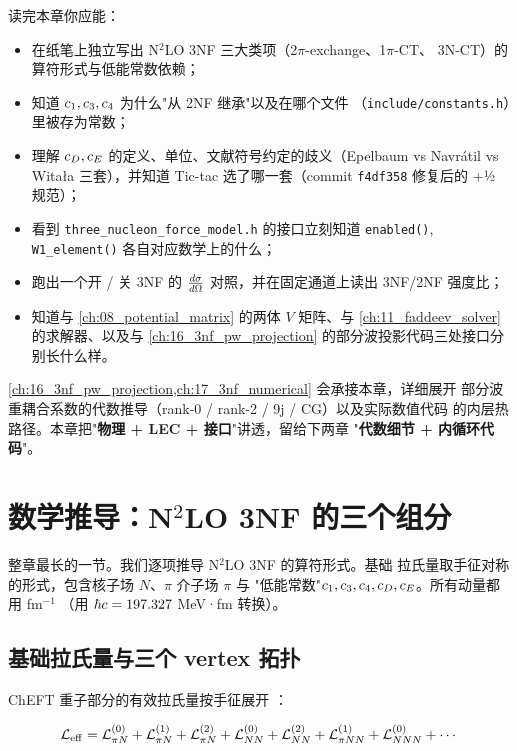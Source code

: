 读完本章你应能：
\begin{itemize}
\item 在纸笔上独立写出 N\(^2\)LO 3NF 三大类项（2\(\pi\)-exchange、1\(\pi\)-CT、
      3N-CT）的算符形式与低能常数依赖；
\item 知道 \(c_1, c_3, c_4\) 为什么"从 2NF 继承"以及在哪个文件
      （\texttt{include/constants.h}）里被存为常数；
\item 理解 \(c_D, c_E\) 的定义、单位、文献符号约定的歧义（Epelbaum vs
      Navrátil vs Witała 三套），并知道 Tic-tac 选了哪一套（commit
      \texttt{f4df358} 修复后的 +½ 规范）；
\item 看到 \texttt{three\_nucleon\_force\_model.h} 的接口立刻知道
      \texttt{enabled()}, \texttt{W1\_element()} 各自对应数学上的什么；
\item 跑出一个开 / 关 3NF 的 \(\frac{d\sigma}{d\Omega}\) 对照，并在固定通道上读出 3NF/2NF 强度比；
\item 知道与 \cref{ch:08_potential_matrix} 的两体 \(V\) 矩阵、与
      \cref{ch:11_faddeev_solver} 的求解器、以及与 \cref{ch:16_3nf_pw_projection}
      的部分波投影代码三处接口分别长什么样。
\end{itemize}

\cref{ch:16_3nf_pw_projection,ch:17_3nf_numerical} 会承接本章，详细展开
部分波重耦合系数的代数推导（rank-0 / rank-2 / 9j / CG）以及实际数值代码
的内层热路径。本章把"\textbf{物理 + LEC + 接口}"讲透，留给下两章
"\textbf{代数细节 + 内循环代码}"。

\section{数学推导：N\({}^2\)LO 3NF 的三个组分}
\label{sec:ch15-math}

整章最长的一节。我们逐项推导 N\(^2\)LO 3NF 的算符形式。基础
拉氏量取手征对称的形式，包含核子场 \(N\)、\(\pi\) 介子场 \(\pi\) 与
"低能常数"\(c_1, c_3, c_4, c_D, c_E\)。所有动量都用 fm\(^{-1}\)
（用 \(\hbar c = 197.327\) MeV·fm 转换）。

\subsection{基础拉氏量与三个 vertex 拓扑}
\label{subsec:ch15-lagrangian}

ChEFT 重子部分的有效拉氏量按手征展开 \cite{Epelbaum2002NLO3NF}：

\begin{equation}
\label{eq:ch15-Leff}
\mathcal{L}_{\rm eff}
= \mathcal{L}^{(0)}_{\pi N} + \mathcal{L}^{(1)}_{\pi N} + \mathcal{L}^{(2)}_{\pi N}
+ \mathcal{L}^{(0)}_{NN} + \mathcal{L}^{(2)}_{NN}
+ \mathcal{L}^{(1)}_{\pi NN} + \mathcal{L}^{(0)}_{NNN} + \cdots
\end{equation}

